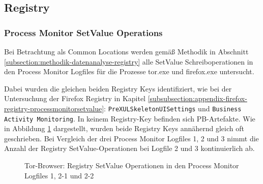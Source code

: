 \begin{appendices}
\subsection{Registry}

\subsubsection*{Process Monitor SetValue Operations}

Bei Betrachtung als Common Locations werden gemäß Methodik in Abschnitt \ref{subsection:methodik-datenanalyse-registry} alle \glqq{}SetValue\grqq{} Schreiboperationen in den Process Monitor Logfiles für die Prozesse \glqq{}tor.exe\grqq{} und \glqq{}firefox.exe\grqq{} untersucht. 

Dabei wurden die gleichen beiden Registry Keys identifiziert, wie bei der Untersuchung der Firefox Registry in Kapitel \ref{subsubsection:appendix-firefox-registry-processmonitorsetvalue}: \texttt{PreXULSkeletonUISettings} und \texttt{Business Activity Monitoring}. In keinem Registry-Key befinden sich PB-Artefakte.
Wie in Abbildung \ref{chart:tor-registy-css-vs-bam} dargestellt, wurden beide Registry Keys annähernd gleich oft geschrieben. Bei Vergleich der drei Process Monitor Logfiles 1, 2 und 3 nimmt die Anzahl der Registry \glqq{}SetValue\grqq{}-Operationen bei Logfile 2 und 3 kontinuierlich ab.

\begin{figure}[h!]
	\caption{Tor-Browser: Registry \glqq{}SetValue\grqq{} Operationen in den Process Monitor Logfiles 1, 2-1 und 2-2}
	\label{chart:tor-registy-css-vs-bam}
\end{figure}


\end{appendices}
